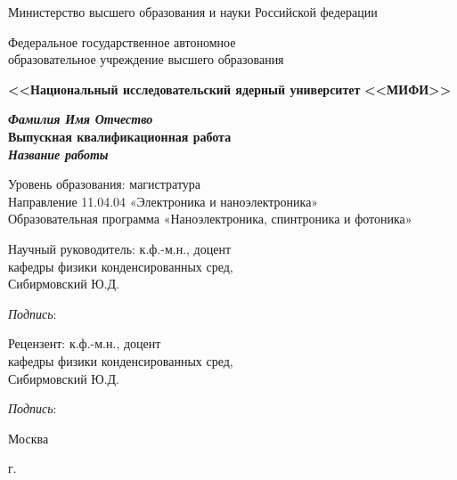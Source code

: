 \begin{titlepage}
\begin{center}
Министерство высшего образования и науки Российской федерации

Федеральное государственное автономное \\образовательное учреждение высшего образования

\textbf{<<Национальный исследовательский ядерный университет}
\textbf{<<МИФИ>>}

\vspace{25mm}

\textbf{\textit{\large Фамилия Имя Отчество}} \\[8mm]
\textbf{\large Выпускная квалификационная работа}\\[3mm]
\textbf{\textit{\large Название работы}}

\vspace{15mm}
Уровень образования: магистратура\\
Направление 11.04.04 «Электроника и наноэлектроника»\\
Образовательная программа
«Наноэлектроника, спинтроника и фотоника»

\vspace{10mm}

\begin{flushright}
\begin{minipage}[t]{0.7\textwidth}
{Научный руководитель:} к.ф.-м.н., доцент\\
кафедры физики конденсированных сред, \\Сибирмовский Ю.Д. 

\vspace{5mm}

\textit{Подпись}: \hrulefill

\vspace{10mm}

{Рецензент:} к.ф.-м.н., доцент\\
кафедры физики конденсированных сред, \\Сибирмовский Ю.Д. 

\vspace{5mm}

\textit{Подпись}: \hrulefill

\end{minipage}
\end{flushright}

\vfill 

{Москва}
\par{\the\year{} г.}
\end{center}
\end{titlepage}
\restoregeometry
\addtocounter{page}{1}
